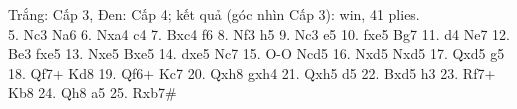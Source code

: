 Trắng: Cấp 3, Đen: Cấp 4; kết quả (góc nhìn Cấp 3): win, 41 plies.\\
5. Nc3 Na6 6. Nxa4 c4 7. Bxc4 f6 8. Nf3 h5 9. Nc3 e5 10. fxe5 Bg7 11. d4 Ne7 12. Be3 fxe5 13. Nxe5 Bxe5 14. dxe5 Nc7 15. O-O Ncd5 16. Nxd5 Nxd5 17. Qxd5 g5 18. Qf7+ Kd8 19. Qf6+ Kc7 20. Qxh8 gxh4 21. Qxh5 d5 22. Bxd5 h3 23. Rf7+ Kb8 24. Qh8 a5 25. Rxb7\#
